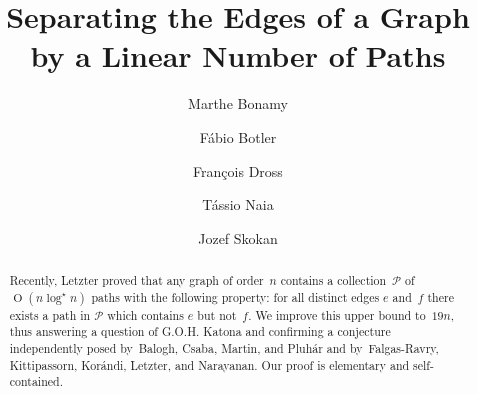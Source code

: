 \documentclass{aic}
\DeclareMathOperator{\bigoh}{\mathrm{O}}
\begin{document}
\begin{frontmatter}[classification=text]


\title{Separating the Edges of a Graph by a Linear Number of Paths}

\author[bonamy]{Marthe Bonamy}
\author[botler]{F\'abio Botler}
\author[dross]{François Dross}
\author[naia]{T\'assio Naia}
\author[skokan]{Jozef Skokan}

\begin{abstract}
Recently, Letzter proved that any graph of order~\(n\)
contains a collection~$\mathcal{P}$ of \(\bigoh(n\log^\star n)\)
paths with the following property:
for all distinct edges $e$ and~$f$ there exists a path in $\mathcal{P}$
which contains \(e\) but not~\(f\).
We improve this upper bound to~\(19 n\), thus answering a question of G.O.H. Katona and
confirming a conjecture independently posed
by~Balogh, Csaba, Martin, and Pluh\'ar and
by~Falgas-Ravry, Kittipassorn, Kor\'andi, Letzter,  and Narayanan. Our proof is elementary and self-contained.
\end{abstract}
\end{frontmatter}
\end{document}
